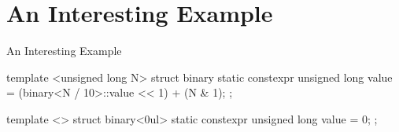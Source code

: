 \section{An Interesting Example}

\begin{frame}[fragile]{An Interesting Example}
    \begin{cpp}
template <unsigned long N>
struct binary {
  static constexpr unsigned long value
      = (binary<N / 10>::value << 1) + (N & 1);
};

template <>
struct binary<0ul> {
  static constexpr unsigned long value = 0;
};
    \end{cpp}
\end{frame}
